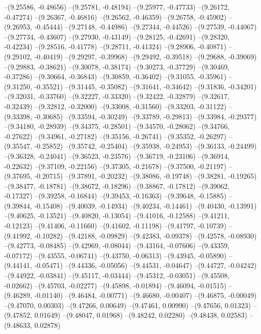 --(9.25586, -0.48656)
--(9.25781, -0.48194)
--(9.25977, -0.47733)
--(9.26172, -0.47274)
--(9.26367, -0.46816)
--(9.26562, -0.46359)
--(9.26758, -0.45902)
--(9.26953, -0.45444)
--(9.27148, -0.44986)
--(9.27344, -0.44526)
--(9.27539, -0.44067)
--(9.27734, -0.43607)
--(9.27930, -0.43149)
--(9.28125, -0.42691)
--(9.28320, -0.42234)
--(9.28516, -0.41778)
--(9.28711, -0.41324)
--(9.28906, -0.40871)
--(9.29102, -0.40419)
--(9.29297, -0.39968)
--(9.29492, -0.39518)
--(9.29688, -0.39069)
--(9.29883, -0.38621)
--(9.30078, -0.38174)
--(9.30273, -0.37729)
--(9.30469, -0.37286)
--(9.30664, -0.36843)
--(9.30859, -0.36402)
--(9.31055, -0.35961)
--(9.31250, -0.35521)
--(9.31445, -0.35082)
--(9.31641, -0.34642)
--(9.31836, -0.34201)
--(9.32031, -0.33760)
--(9.32227, -0.33320)
--(9.32422, -0.32879)
--(9.32617, -0.32439)
--(9.32812, -0.32000)
--(9.33008, -0.31560)
--(9.33203, -0.31122)
--(9.33398, -0.30685)
--(9.33594, -0.30249)
--(9.33789, -0.29813)
--(9.33984, -0.29377)
--(9.34180, -0.28939)
--(9.34375, -0.28501)
--(9.34570, -0.28062)
--(9.34766, -0.27622)
--(9.34961, -0.27182)
--(9.35156, -0.26741)
--(9.35352, -0.26297)
--(9.35547, -0.25852)
--(9.35742, -0.25404)
--(9.35938, -0.24953)
--(9.36133, -0.24499)
--(9.36328, -0.24041)
--(9.36523, -0.23576)
--(9.36719, -0.23106)
--(9.36914, -0.22632)
--(9.37109, -0.22156)
--(9.37305, -0.21678)
--(9.37500, -0.21197)
--(9.37695, -0.20715)
--(9.37891, -0.20232)
--(9.38086, -0.19748)
--(9.38281, -0.19265)
--(9.38477, -0.18781)
--(9.38672, -0.18296)
--(9.38867, -0.17812)
--(9.39062, -0.17327)
--(9.39258, -0.16844)
--(9.39453, -0.16363)
--(9.39648, -0.15885)
--(9.39844, -0.15408)
--(9.40039, -0.14934)
--(9.40234, -0.14461)
--(9.40430, -0.13991)
--(9.40625, -0.13521)
--(9.40820, -0.13054)
--(9.41016, -0.12588)
--(9.41211, -0.12123)
--(9.41406, -0.11660)
--(9.41602, -0.11198)
--(9.41797, -0.10739)
--(9.41992, -0.10282)
--(9.42188, -0.09829)
--(9.42383, -0.09378)
--(9.42578, -0.08930)
--(9.42773, -0.08485)
--(9.42969, -0.08044)
--(9.43164, -0.07606)
--(9.43359, -0.07172)
--(9.43555, -0.06741)
--(9.43750, -0.06313)
--(9.43945, -0.05890)
--(9.44141, -0.05471)
--(9.44336, -0.05056)
--(9.44531, -0.04647)
--(9.44727, -0.04242)
--(9.44922, -0.03841)
--(9.45117, -0.03444)
--(9.45312, -0.03051)
--(9.45508, -0.02662)
--(9.45703, -0.02277)
--(9.45898, -0.01894)
--(9.46094, -0.01515)
--(9.46289, -0.01140)
--(9.46484, -0.00771)
--(9.46680, -0.00407)
--(9.46875, -0.00049)
--(9.47070, 0.00303)
--(9.47266, 0.00649)
--(9.47461, 0.00990)
--(9.47656, 0.01323)
--(9.47852, 0.01649)
--(9.48047, 0.01968)
--(9.48242, 0.02280)
--(9.48438, 0.02583)
--(9.48633, 0.02878)
